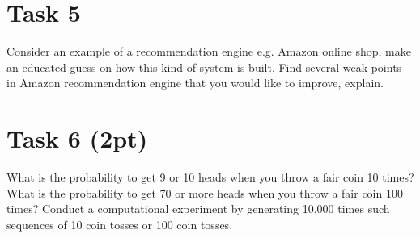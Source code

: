 \documentclass{article}
\begin{document}
\section*{Task 5}
Consider an example of a recommendation engine e.g. Amazon online shop, make an educated guess on how this kind of system is built. Find several weak points in Amazon recommendation engine that you would like to improve, explain.

\section*{Task 6 (2pt)}
What is the probability to get 9 or 10 heads when you throw a fair coin 10 times? What is the probability to get 70 or more heads when you throw a fair coin 100 times? Conduct a computational experiment by generating 10,000 times such sequences of 10 coin tosses or 100 coin tosses.
\end{document}
